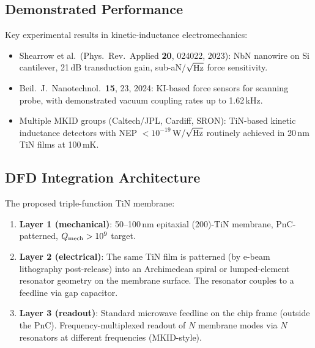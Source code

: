 \documentclass[11pt]{article}
\theoremstyle{remark}
\begin{document}
\subsection{Demonstrated Performance}

Key experimental results in kinetic-inductance electromechanics:

\begin{itemize}[nosep]
  \item Shearrow et al.\ (Phys.\ Rev.\ Applied \textbf{20}, 024022, 2023):
    NbN nanowire on Si cantilever, 21\,dB transduction gain,
    sub-aN/$\sqrt{\rm Hz}$ force sensitivity.
  \item Beil.\ J.\ Nanotechnol.\ \textbf{15}, 23, 2024: KI-based force
    sensors for scanning probe, with demonstrated vacuum coupling rates
    up to 1.62\,kHz.
  \item Multiple MKID groups (Caltech/JPL, Cardiff, SRON): TiN-based
    kinetic inductance detectors with NEP $< 10^{-19}$\,W/$\sqrt{\rm Hz}$
    routinely achieved in 20\,nm TiN films at 100\,mK.
\end{itemize}

\subsection{DFD Integration Architecture}

The proposed triple-function TiN membrane:

\begin{enumerate}[nosep]
  \item \textbf{Layer 1 (mechanical)}: 50--100\,nm epitaxial (200)-TiN
    membrane, PnC-patterned, $Q_{\rm mech} > 10^9$ target.
  \item \textbf{Layer 2 (electrical)}: The same TiN film is patterned
    (by e-beam lithography post-release) into an Archimedean spiral
    or lumped-element resonator geometry on the membrane surface.
    The resonator couples to a feedline via gap capacitor.
  \item \textbf{Layer 3 (readout)}: Standard microwave feedline on the
    chip frame (outside the PnC). Frequency-multiplexed readout of
    $N$ membrane modes via $N$ resonators at different frequencies
    (MKID-style).
\end{enumerate}
\end{document}
